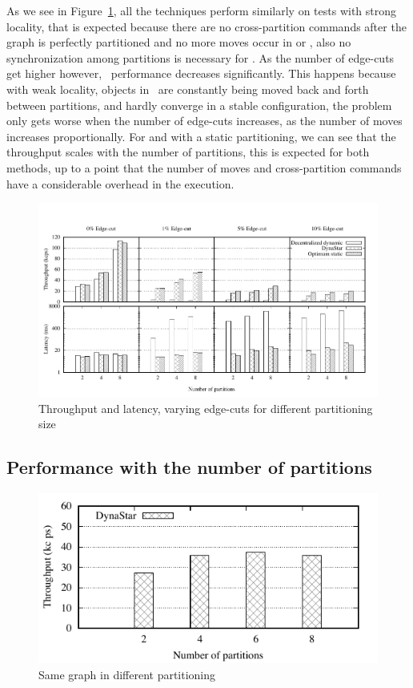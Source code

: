 As we see in Figure~\ref{fig:varying_edge_cut}, all the techniques
perform similarly on tests with strong locality, that is expected
because there are no cross-partition commands after the graph is
perfectly partitioned and no more moves occur in \dynastar or \dssmr,
also no synchronization among partitions is necessary for \ssmr.  As
the number of edge-cuts get higher however, \dssmr\ performance
decreases significantly.  This happens because with weak locality,
objects in \dssmr\ are constantly being moved back and forth between
partitions, and hardly converge in a stable configuration, the problem
only gets worse when the number of edge-cuts increases, as the number
of moves increases proportionally.  For \dynastar and \ssmr with a
static partitioning, we can see that the throughput scales with the
number of partitions, this is expected for both methods, up to a point
that the number of moves and cross-partition commands have a
considerable overhead in the execution.

\begin{figure}[ht!]
	\includegraphics{figures/experiments/throughput-latency-avg-all}
	\caption{Throughput and latency, varying edge-cuts for different partitioning size}
	\label{fig:varying_edge_cut}
\end{figure}


\subsection{Performance with the number of partitions}
\label{sec:evaluation:results}

\begin{figure}[ht]
	\includegraphics{figures/experiments/throughput-avg-vary-partition}
	\caption{Same graph in different partitioning}
	\label{fig:4p1p_varying_partition_size}
\end{figure}


